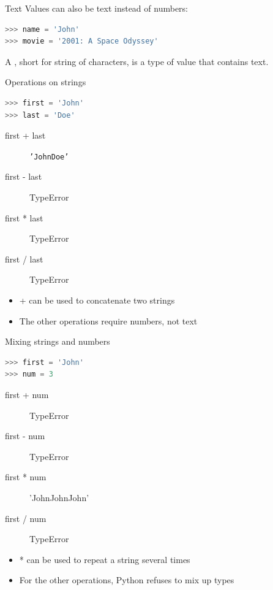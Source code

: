 \documentclass[aspectratio=169,usenames,dvipsnames]{beamer}
\begin{document}
\begin{frame}[fragile]{Text}
Values can also be text instead of numbers:
\begin{lstlisting}[language=python]
>>> name = 'John'
>>> movie = '2001: A Space Odyssey'
\end{lstlisting}

\pause
    \begin{definition}
        A , short for string of characters,
        is a type of value that contains text.
    \end{definition}
\end{frame}

\begin{frame}[fragile]{Operations on strings}
\begin{lstlisting}[language=python]
>>> first = 'John'
>>> last = 'Doe'
\end{lstlisting}
\begin{description}
    \item[first + last] \texttt{'JohnDoe'}
    \item[first - last] TypeError
    \item[first * last] TypeError
    \item[first / last] TypeError
\end{description}

\begin{itemize}
\item + can be used to concatenate two strings
\item The other operations require numbers, not text
\end{itemize}
\end{frame}

\begin{frame}[fragile]{Mixing strings and numbers}
\begin{lstlisting}[language=python]
>>> first = 'John'
>>> num = 3
\end{lstlisting}
\begin{description}
    \item[first + num] TypeError
    \item[first - num] TypeError
    \item[first * num] 'JohnJohnJohn'
    \item[first / num] TypeError
\end{description}

\begin{itemize}
\item * can be used to repeat a string several times
\item For the other operations, Python refuses to mix up types
\end{itemize}
\end{frame}
\end{document}

